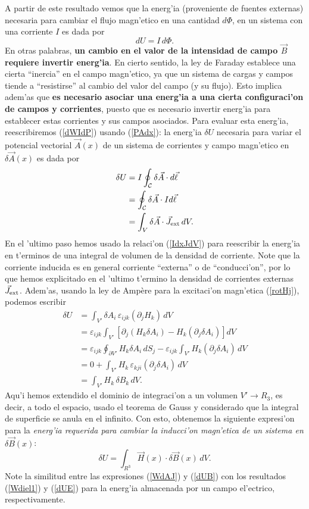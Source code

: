 A partir de este resultado vemos que la energ'ia (proveniente de fuentes externas) necesaria para cambiar el flujo magn'etico en una cantidad $d\Phi$, en un sistema con una corriente $I$ es dada por
\begin{equation}\label{dWIdP}
 \boxed{dU=I\,d\Phi.}
\end{equation}
En otras palabras, \textbf{un cambio en el valor de la intensidad de campo $\vec{B}$ requiere invertir energ'ia}. En cierto sentido, la ley de Faraday establece una cierta ``inercia'' en el campo magn'etico, ya que un sistema de cargas y campos tiende a ``resistirse'' al cambio del valor del campo (y su flujo). 
Esto implica adem'as que \textbf{es necesario asociar una energ'ia a una cierta configuraci'on de campos y corrientes}, puesto que es necesario invertir energ'ia para establecer estas corrientes y sus campos asociados. Para evaluar esta energ'ia, reescribiremos (\ref{dWIdP}) usando (\ref{PAdx}): la energ'ia $\delta U$ necesaria para variar el potencial vectorial $\vec{A}(x)$ de un sistema de corrientes y campo magn'etico en $\delta\vec{A}(x)$ es dada por
\begin{align}
 \delta U &= I\oint_{\cal C}\delta\vec{A}\cdot d\vec{\ell} \\
 &= \oint_{\cal C}\delta\vec{A}\cdot Id\vec{\ell} \\
 &= \int_V\delta\vec{A}\cdot \vec{J}_{\rm ext}\,dV. \label{WdAJ}
\end{align}
En el 'ultimo paso hemos usado la relaci'on (\ref{IdxJdV}) para reescribir la energ'ia en t'erminos de una integral de volumen de la densidad de corriente. Note que la corriente inducida es en general corriente ``externa'' o de ``conducci'on'', por lo que hemos explicitado en el 'ultimo t'ermino la densidad de corrientes externas $\vec{J}_{\rm ext}$. Adem'as, usando la ley de Amp\`ere para la excitaci'on magn'etica (\ref{rotHj}), podemos escribir
\begin{align}
 \delta U 
&= \int_{V'} \delta A_i\,\varepsilon_{ijk}\left(\partial_jH_k\right)\,dV \\
&= \varepsilon_{ijk}\int_{V'} \left[\partial_j(H_k\delta A_i)-H_k(\partial_j\delta A_i)\right]dV\\
&= \varepsilon_{ijk}\oint_{\partial V'}H_k\delta
A_i\,dS_j-\varepsilon_{ijk}\int_{V'}H_k(\partial_j\delta A_i)\,dV\\
&= 0+\int_{V'} H_k\,\varepsilon_{kji}(\partial_j\delta A_i)\,dV\\
&= \int_{V'} H_k\,\delta B_k\,dV.
\end{align}
Aqu'i hemos extendido el dominio de integraci'on a un volumen $V'\to R_3$, es decir, a  todo el espacio, usado el teorema de Gauss y considerado que la integral de superficie se anula en el infinito. Con esto, obtenemos la siguiente expresi'on para la \textit{energ'ia requerida para cambiar la inducci'on magn'etica de un sistema en $\delta{\vec B}(x)$}:
\begin{equation}
 \boxed{\delta U=\int_{R^3} \vec{H}(x)\cdot \delta\vec{B}(x)\,dV.}\label{dUB}
\end{equation}
Note la similitud entre las expresiones (\ref{WdAJ}) y (\ref{dUB}) con los resultados (\ref{Wdiel1}) y (\ref{dUE}) para la energ'ia almacenada por un campo el'ectrico, respectivamente.

